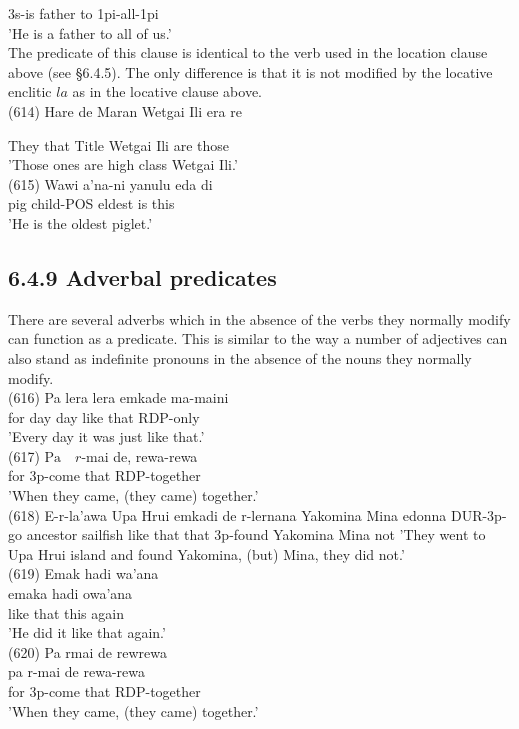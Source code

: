 \documentclass[10pt]{article}
\begin{document}
3s-is father to 1pi-all-1pi\\
'He is a father to all of us.'\\
The predicate of this clause is identical to the verb used in the location clause above (see §6.4.5). The only difference is that it is not modified by the locative enclitic \(l a\) as in the locative clause above.\\
(614) Hare de Maran Wetgai Ili era re

They that Title Wetgai Ili are those\\
'Those ones are high class Wetgai Ili.'\\
(615) Wawi a'na-ni yanulu eda di\\
pig child-POS eldest is this\\
'He is the oldest piglet.'

\subsection*{6.4.9 Adverbal predicates}
There are several adverbs which in the absence of the verbs they normally modify can function as a predicate. This is similar to the way a number of adjectives can also stand as indefinite pronouns in the absence of the nouns they normally modify.\\
(616) Pa lera lera emkade ma-maini\\
for day day like that RDP-only\\
'Every day it was just like that.'\\
(617) \(\mathrm{Pa} \quad r\)-mai de, rewa-rewa\\
for 3p-come that RDP-together\\
'When they came, (they came) together.'\\
(618) E-r-la'awa Upa Hrui emkadi de r-lernana Yakomina Mina edonna DUR-3p-go ancestor sailfish like that that 3p-found Yakomina Mina not 'They went to Upa Hrui island and found Yakomina, (but) Mina, they did not.'\\
(619) Emak hadi wa'ana\\
emaka hadi owa'ana\\
like that this again\\
'He did it like that again.'\\
(620) Pa rmai de rewrewa\\
pa r-mai de rewa-rewa\\
for 3p-come that RDP-together\\
'When they came, (they came) together.'
\end{document}
